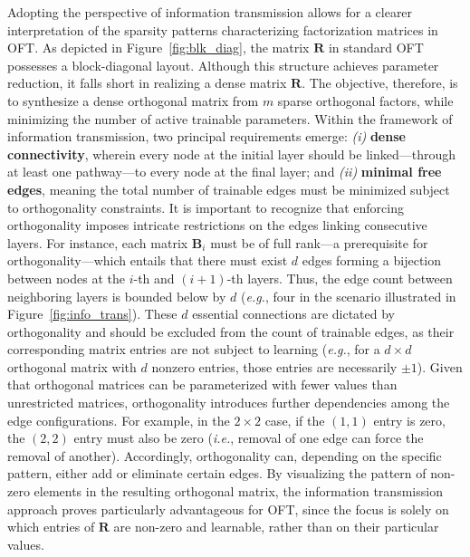 Adopting the perspective of information transmission allows for a clearer interpretation of the sparsity patterns characterizing factorization matrices in OFT. As depicted in Figure~\ref{fig:blk_diag}, the matrix $\bm{R}$ in standard OFT possesses a block-diagonal layout. Although this structure achieves parameter reduction, it falls short in realizing a dense matrix $\bm{R}$. The objective, therefore, is to synthesize a dense orthogonal matrix from $m$ sparse orthogonal factors, while minimizing the number of active trainable parameters. Within the framework of information transmission, two principal requirements emerge: \emph{(i)} \textbf{dense connectivity}, wherein every node at the initial layer should be linked—through at least one pathway—to every node at the final layer; and \emph{(ii)} \textbf{minimal free edges}, meaning the total number of trainable edges must be minimized subject to orthogonality constraints. It is important to recognize that enforcing orthogonality imposes intricate restrictions on the edges linking consecutive layers. For instance, each matrix $\bm{B}_i$ must be of full rank—a prerequisite for orthogonality—which entails that there must exist $d$ edges forming a bijection between nodes at the $i$-th and $(i+1)$-th layers. Thus, the edge count between neighboring layers is bounded below by $d$ (\emph{e.g.}, four in the scenario illustrated in Figure~\ref{fig:info_trans}). These $d$ essential connections are dictated by orthogonality and should be excluded from the count of trainable edges, as their corresponding matrix entries are not subject to learning (\emph{e.g.}, for a $d\times d$ orthogonal matrix with $d$ nonzero entries, those entries are necessarily $\pm 1$). Given that orthogonal matrices can be parameterized with fewer values than unrestricted matrices, orthogonality introduces further dependencies among the edge configurations. For example, in the $2\times 2$ case, if the $(1,1)$ entry is zero, the $(2,2)$ entry must also be zero (\emph{i.e.}, removal of one edge can force the removal of another). Accordingly, orthogonality can, depending on the specific pattern, either add or eliminate certain edges. By visualizing the pattern of non-zero elements in the resulting orthogonal matrix, the information transmission approach proves particularly advantageous for OFT, since the focus is solely on which entries of $\bm{R}$ are non-zero and learnable, rather than on their particular values.

